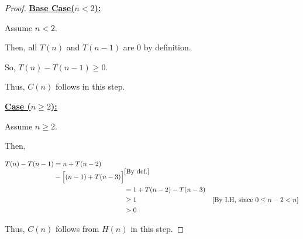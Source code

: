 \documentclass[12pt]{article}
\begin{document}
\begin{itemize}
\begin{proof}
        \bigskip

        \underline{\textbf{Base Case($n < 2$):}}

        \bigskip

        Assume $n < 2$.

        \bigskip

        Then, all $T(n)$ and $T(n-1)$ are 0 by definition.

        \bigskip

        So, $T(n) - T(n-1) \geq 0$.

        \bigskip

        Thus, $C(n)$ follows in this step.

        \bigskip

        \underline{\textbf{Case ($n \geq 2$):}}

        \bigskip

        Assume $n \geq 2$.

        \bigskip

        Then,

        \begin{align}
        \begin{split}
        T(n) - T(n-1) &= n + T(n-2)\\
        &- \Bigl[(n-1) + T(n-3) \Bigr]
        \end{split} & [\text{By def.}]\\
        &= 1 + T(n-2) - T(n-3)\\
        &\geq 1 & [\text{By I.H, since $0 \leq n-2 < n$}]\\
        &> 0
        \end{align}

        \bigskip

        Thus, $C(n)$ follows from $H(n)$ in this step.
    \end{proof}








\end{itemize}
\end{document}
